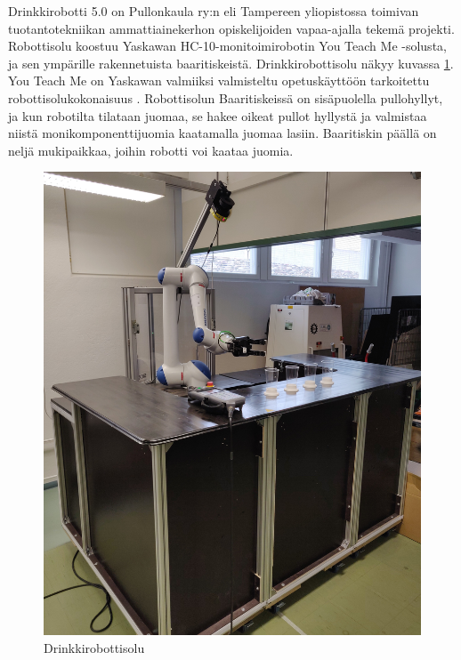 Drinkkirobotti 5.0 on Pullonkaula ry:n eli Tampereen yliopistossa toimivan tuotantotekniikan ammattiainekerhon opiskelijoiden vapaa-ajalla tekemä projekti. Robottisolu koostuu Yaskawan HC-10-monitoimirobotin You Teach Me \hyp{}solusta, ja sen ympärille rakennetuista baaritiskeistä. Drinkkirobottisolu näkyy kuvassa \ref{fig:drinkkirobotti}. You Teach Me on Yaskawan valmiiksi valmisteltu opetuskäyttöön tarkoitettu robottisolukokonaisuus \cite{Yaskawa2017}. Robottisolun  Baaritiskeissä on sisäpuolella pullohyllyt, ja kun robotilta tilataan juomaa, se hakee oikeat pullot hyllystä ja valmistaa niistä monikomponenttijuomia kaatamalla juomaa lasiin. Baaritiskin päällä on neljä mukipaikkaa, joihin robotti voi kaataa juomia.

\begin{figure}[h]
\begin{center}
\includegraphics[scale=0.08]{img/drinkkirobotti.jpg}   %
\end{center}
\caption{Drinkkirobottisolu}
\label{fig:drinkkirobotti}
\end{figure}

